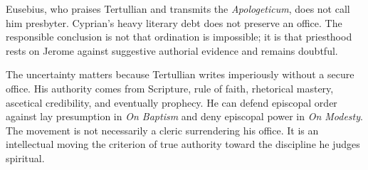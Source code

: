 Eusebius, who praises Tertullian and transmits the \emph{Apologeticum}, does not
call him presbyter. Cyprian's heavy literary debt does not preserve an office.
The responsible conclusion is not that ordination is impossible; it is that
priesthood rests on Jerome against suggestive authorial evidence and remains
doubtful.

The uncertainty matters because Tertullian writes imperiously without a secure
office. His authority comes from Scripture, rule of faith, rhetorical mastery,
ascetical credibility, and eventually prophecy. He can defend episcopal order
against lay presumption in \emph{On Baptism} and deny episcopal power in
\emph{On Modesty}. The movement is not necessarily a cleric surrendering his
office. It is an intellectual moving the criterion of true authority toward the
discipline he judges spiritual.
